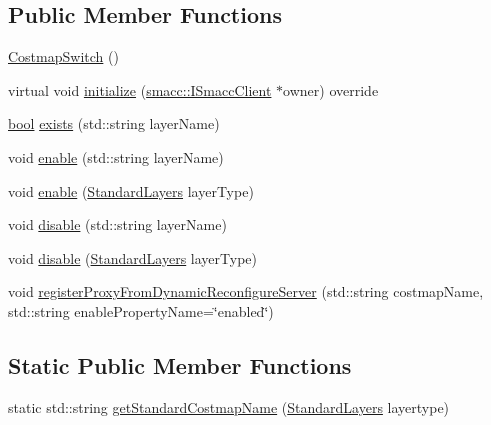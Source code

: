 \subsection*{Public Member Functions}
\begin{DoxyCompactItemize}
\item 
\hyperlink{classcl__move__base__z_1_1CostmapSwitch_a768d35402a2fdc5afce3988b3fe95e94}{Costmap\+Switch} ()
\item 
virtual void \hyperlink{classcl__move__base__z_1_1CostmapSwitch_af629ac6f390f90c0b6ad1008fa6b2586}{initialize} (\hyperlink{classsmacc_1_1ISmaccClient}{smacc\+::\+I\+Smacc\+Client} $\ast$owner) override
\item 
\hyperlink{classbool}{bool} \hyperlink{classcl__move__base__z_1_1CostmapSwitch_ae9cfc1152e625763beb7997c5dbed70b}{exists} (std\+::string layer\+Name)
\item 
void \hyperlink{classcl__move__base__z_1_1CostmapSwitch_ad2366ec89f6cb922b6d4a6c8d2627e97}{enable} (std\+::string layer\+Name)
\item 
void \hyperlink{classcl__move__base__z_1_1CostmapSwitch_ac30d812503a62ea594587d8ab552d7c3}{enable} (\hyperlink{classcl__move__base__z_1_1CostmapSwitch_af38aeee5e3893e689cd74ddddfe0df15}{Standard\+Layers} layer\+Type)
\item 
void \hyperlink{classcl__move__base__z_1_1CostmapSwitch_af7cc8007da601736b445c051a6fbd49a}{disable} (std\+::string layer\+Name)
\item 
void \hyperlink{classcl__move__base__z_1_1CostmapSwitch_a37bfce155e049637d8444bb901c880af}{disable} (\hyperlink{classcl__move__base__z_1_1CostmapSwitch_af38aeee5e3893e689cd74ddddfe0df15}{Standard\+Layers} layer\+Type)
\item 
void \hyperlink{classcl__move__base__z_1_1CostmapSwitch_a0d04ca7b655f850ba3107393f1c437cb}{register\+Proxy\+From\+Dynamic\+Reconfigure\+Server} (std\+::string costmap\+Name, std\+::string enable\+Property\+Name=\char`\"{}enabled\char`\"{})
\end{DoxyCompactItemize}
\subsection*{Static Public Member Functions}
\begin{DoxyCompactItemize}
\item 
static std\+::string \hyperlink{classcl__move__base__z_1_1CostmapSwitch_ac46796874242fdaa7efef86b66a55102}{get\+Standard\+Costmap\+Name} (\hyperlink{classcl__move__base__z_1_1CostmapSwitch_af38aeee5e3893e689cd74ddddfe0df15}{Standard\+Layers} layertype)
\end{DoxyCompactItemize}
